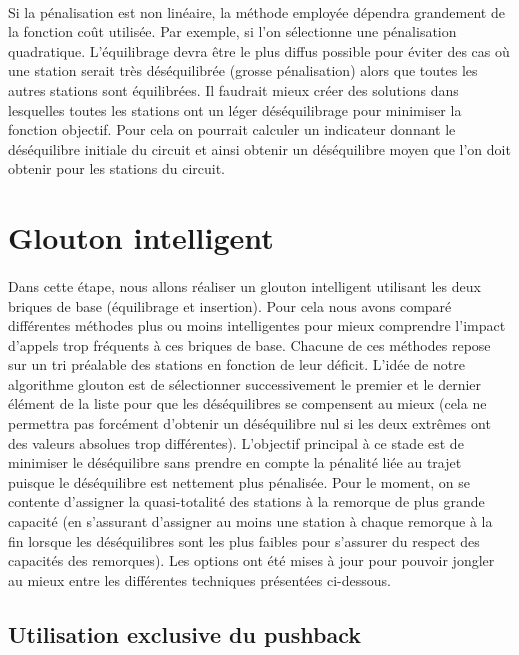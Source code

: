 \documentclass[a4paper, 11pt]{article} %
\begin{document}
\paragraph*{}
Si la pénalisation est non linéaire, la méthode employée dépendra grandement de la fonction coût utilisée. Par exemple, si l'on sélectionne une pénalisation quadratique. L'équilibrage devra être le plus diffus possible pour éviter des cas où une station serait très déséquilibrée (grosse pénalisation) alors que toutes les autres stations sont équilibrées. Il faudrait mieux créer des solutions dans lesquelles toutes les stations ont un léger déséquilibrage pour minimiser la fonction objectif. Pour cela on pourrait calculer un indicateur donnant le déséquilibre initiale du circuit et ainsi obtenir un déséquilibre moyen que l'on doit obtenir pour les stations du circuit.

\section{Glouton intelligent}

\paragraph*{}
Dans cette étape, nous allons réaliser un glouton intelligent utilisant les deux briques de base (équilibrage et insertion). Pour cela nous avons comparé différentes méthodes plus ou moins intelligentes pour mieux comprendre l'impact d'appels trop fréquents à ces briques de base. Chacune de ces méthodes repose sur un tri préalable des stations en fonction de leur déficit. L'idée de notre algorithme glouton est de sélectionner successivement le premier et le dernier élément de la liste pour que les déséquilibres se compensent au mieux (cela ne permettra pas forcément d'obtenir un déséquilibre nul si les deux extrêmes ont des valeurs absolues trop différentes). L'objectif principal à ce stade est de minimiser le déséquilibre sans prendre en compte la pénalité liée au trajet puisque le déséquilibre est nettement plus pénalisée. Pour le moment, on se contente d'assigner la quasi-totalité des stations à la remorque de plus grande capacité (en s'assurant d'assigner au moins une station à chaque remorque à la fin lorsque les déséquilibres sont les plus faibles pour s'assurer du respect des capacités des remorques). Les options ont été mises à jour pour pouvoir jongler au mieux entre les différentes techniques présentées ci-dessous.

\subsection{Utilisation exclusive du pushback}
\end{document}

